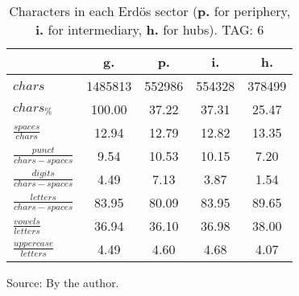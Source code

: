 \begin{table}[h!]
\begin{center}
\caption{Characters in each Erd\"os sector ({{\bf p.}} for periphery, {{\bf i.}} for intermediary, 
	{{\bf h.}} for hubs). TAG: 6}\label{tab:cha}
	\def\arraystretch{1.5}
\begin{tabular}{| l || c | c | c | c |}\hline
 & {\bf g.} & {\bf p.} & {\bf i.} & {\bf h.} \\\hline\hline
$chars$ & 1485813  & 552986  & 554328  & 378499 \\
$chars_{\%}$ & 100.00  & 37.22  & 37.31  & 25.47 \\\hline
$\frac{spaces}{chars}$ & 12.94  & 12.79  & 12.82  & 13.35 \\
$\frac{punct}{chars-spaces}$ & 9.54  & 10.53  & 10.15  & 7.20 \\
$\frac{digits}{chars-spaces}$ & 4.49  & 7.13  & 3.87  & 1.54 \\\hline
$\frac{letters}{chars-spaces}$ & 83.95  & 80.09  & 83.95  & 89.65 \\
$\frac{vowels}{letters}$ & 36.94  & 36.10  & 36.98  & 38.00 \\
$\frac{uppercase}{letters}$ & 4.49  & 4.60  & 4.68  & 4.07 \\\hline
\end{tabular}
\begin{flushleft}
		Source: By the author.\
\end{flushleft}
\end{center}
\end{table}
